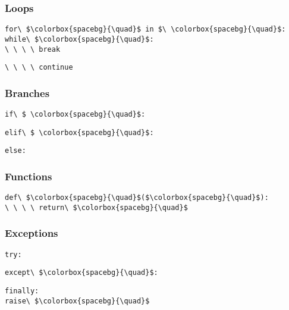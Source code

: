 \documentclass[12pt,twocolumn]{article}
\begin{document}
	\begin{minipage}[t]{0.23\textwidth}
		\subsubsection*{Loops}
		
		\colorbox{codebg}{\lstinline|for\ $\colorbox{spacebg}{\quad}$ in $\ \colorbox{spacebg}{\quad}$:|} \\
		
		\colorbox{codebg}{\lstinline|while\ $\colorbox{spacebg}{\quad}$:|} \\
		
		\colorbox{codebg}{\lstinline|\ \ \ \ break|}
		\vspace{1mm}
		
		\colorbox{codebg}{\lstinline|\ \ \ \ continue|} \\
		
		\subsubsection*{Branches}
		
		\colorbox{codebg}{\lstinline|if\ $ \colorbox{spacebg}{\quad}$:|}
		\vspace{1mm}
		
		\colorbox{codebg}{\lstinline|elif\ $ \colorbox{spacebg}{\quad}$:|}
		\vspace{1mm}
		
		\colorbox{codebg}{\lstinline|else:|}
	\end{minipage}
	\hfill
	\begin{minipage}[t]{0.2\textwidth}
		\subsubsection*{Functions}
		
		\colorbox{codebg}{\lstinline|def\ $\colorbox{spacebg}{\quad}$($\colorbox{spacebg}{\quad}$):|} \\
		
		\colorbox{codebg}{\lstinline|\ \ \ \ return\ $\colorbox{spacebg}{\quad}$|} \\
		
		\subsubsection*{Exceptions}
		
		\colorbox{codebg}{\lstinline|try:|}
		\vspace{1mm}
		
		\colorbox{codebg}{\lstinline|except\ $\colorbox{spacebg}{\quad}$:|}
		\vspace{1mm}
		
		
		\colorbox{codebg}{\lstinline|finally:|} \\
		
		\colorbox{codebg}{\lstinline|raise\ $\colorbox{spacebg}{\quad}$|}
	\end{minipage}
	
\end{document}
